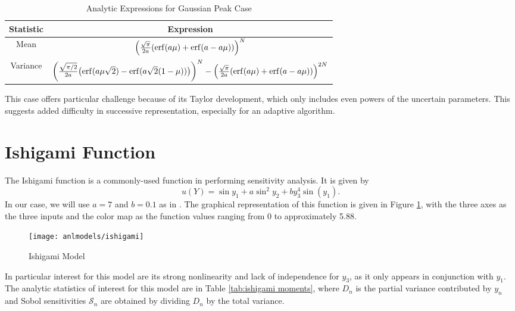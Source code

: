 \begin{table}[H]
  \centering
  \begin{tabular}{c|c}
    Statistic & Expression \\ \hline
    Mean & $\qty(\frac{\sqrt{\pi}}{2a}\qty(\erf(a\mu)+\erf(a-a\mu)))^N$ \\
    Variance & $\qty(\frac{\sqrt{\pi/2}}{2a}\qty(\erf(a\mu\sqrt{2})-\erf(a\sqrt{2}(1-\mu))))^N - \qty(\frac{\sqrt{\pi}}{2a}\qty(\erf(a\mu)+\erf(a-a\mu)))^{2N}$
  \end{tabular}
  \caption{Analytic Expressions for Gaussian Peak Case}
  \label{tab:gausspeak moments}
\end{table}
This case offers particular challenge because of its Taylor development, which only includes even powers of
the uncertain parameters.  This suggests added difficulty in successive representation, especially for an
adaptive algorithm.


\section{Ishigami Function}\label{mod:ishigami}
The Ishigami function \cite{ishigami} is a commonly-used function in performing sensitivity analysis.  It is
given by
\begin{equation}
  u(Y) = \sin{y_1} + a\sin^2{y_2} + b y_3^4\sin(y_1).
\end{equation}
In our case, we will use $a=7$ and $b=0.1$ as in \cite{ishigami2}. 
The graphical representation of this function is given in Figure \ref{fig: ishigami}, with the three axes
as the three inputs and the color map as the function values ranging from 0 to approximately 5.88.
\begin{figure}[htb]
  \centering
  \texttt{[image: anlmodels/ishigami]}
  \caption{Ishigami Model}
  \label{fig: ishigami}
\end{figure}
In particular interest for this model are
its strong nonlinearity and lack of independence for $y_3$, as it only appears in conjunction with $y_1$.  The
analytic statistics of interest for this model are in Table \ref{tab:ishigami moments}, where $D_n$ is the
partial variance contributed by $y_n$ and Sobol sensitivities $\mathcal{S}_n$ are obtained by dividing $D_n$
by the total variance.

